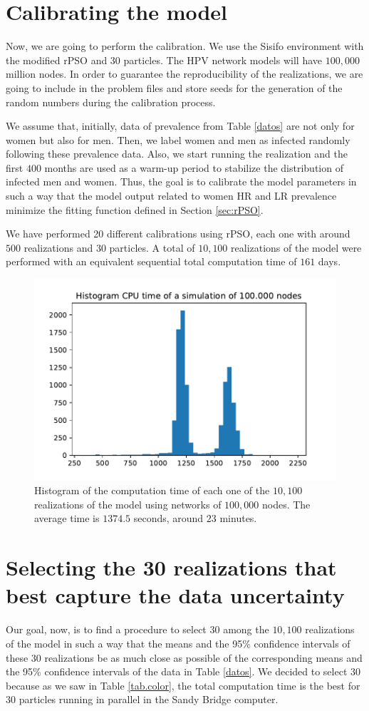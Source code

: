 \section{Calibrating the model}
Now, we are going to perform the calibration. We use the Sisifo environment with the modified rPSO and 30 particles. The HPV network models will have $100,000$ million nodes. In order to guarantee the reproducibility of the realizations, we are going to include in the problem files and store seeds for the generation of the random numbers during the calibration process.

We assume that, initially, data of prevalence from Table \ref{datos} are not only for women but also for men. Then, we label women and men as infected randomly following these prevalence data. Also, we start running the realization and the first $400$ months are used as a warm-up period to stabilize the distribution of infected men and women. Thus, the goal is to calibrate the model parameters in such a way that the model output related to women HR and LR prevalence minimize the fitting function defined in Section \ref{sec:rPSO}.

We have performed 20 different calibrations using rPSO, each one with around $500$ realizations and $30$ particles. A total of $10,100$ realizations of the model were performed with an equivalent sequential total computation time of $161$ days.

\begin{figure}[h!]
	\centering
	\includegraphics[width=0.6\linewidth]{IMGs/1.-Calibrado/Hist_CPU_time.pdf}
	\caption{Histogram of the computation time of each one of the $10,100$ realizations of the model using networks of $100,000$ nodes. The average time is $1374.5$ seconds, around $23$ minutes.}
\end{figure}

\section{Selecting the 30 realizations that best capture the data uncertainty}
Our goal, now, is to find a procedure to select $30$ among the $10,100$ realizations of the model in such a way that the means and the 95\% confidence intervals of these $30$ realizations be as much close as possible of the corresponding means and the 95\% confidence intervals of the data in Table \ref{datos}. We decided to select $30$ because as we saw in Table \ref{tab.color}, the total computation time is the best for $30$ particles running in parallel in the Sandy Bridge computer.

